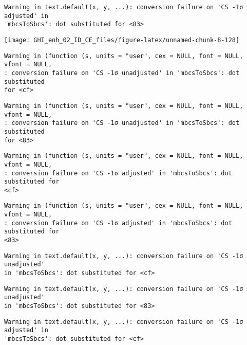 \documentclass[
  10pt,
  a4paper,oneside]{article}
\begin{document}
\begin{verbatim}
Warning in text.default(x, y, ...): conversion failure on 'CS -1σ adjusted' in
'mbcsToSbcs': dot substituted for <83>
\end{verbatim}

\begin{center}\texttt{[image: GHI\_enh\_02\_ID\_CE\_files/figure-latex/unnamed-chunk-8-128]} \end{center}

\begin{verbatim}
Warning in (function (s, units = "user", cex = NULL, font = NULL, vfont = NULL,
: conversion failure on 'CS -1σ unadjusted' in 'mbcsToSbcs': dot substituted
for <cf>
\end{verbatim}

\begin{verbatim}
Warning in (function (s, units = "user", cex = NULL, font = NULL, vfont = NULL,
: conversion failure on 'CS -1σ unadjusted' in 'mbcsToSbcs': dot substituted
for <83>
\end{verbatim}

\begin{verbatim}
Warning in (function (s, units = "user", cex = NULL, font = NULL, vfont = NULL,
: conversion failure on 'CS -1σ adjusted' in 'mbcsToSbcs': dot substituted for
<cf>
\end{verbatim}

\begin{verbatim}
Warning in (function (s, units = "user", cex = NULL, font = NULL, vfont = NULL,
: conversion failure on 'CS -1σ adjusted' in 'mbcsToSbcs': dot substituted for
<83>
\end{verbatim}

\begin{verbatim}
Warning in text.default(x, y, ...): conversion failure on 'CS -1σ unadjusted'
in 'mbcsToSbcs': dot substituted for <cf>
\end{verbatim}

\begin{verbatim}
Warning in text.default(x, y, ...): conversion failure on 'CS -1σ unadjusted'
in 'mbcsToSbcs': dot substituted for <83>
\end{verbatim}

\begin{verbatim}
Warning in text.default(x, y, ...): conversion failure on 'CS -1σ adjusted' in
'mbcsToSbcs': dot substituted for <cf>
\end{verbatim}
\end{document}
